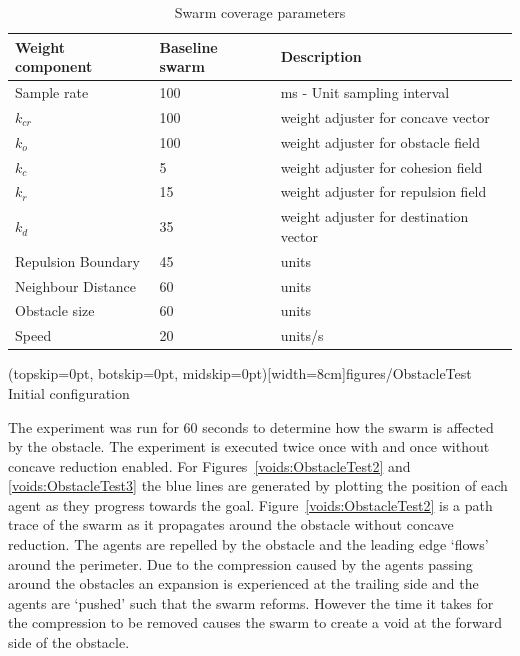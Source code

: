 \documentclass{ieeeaccess}
\begin{document}
\begin{table}
\caption{Swarm coverage parameters}
\label{tab:SwarmCoverageParameters}
\begin{center}
\begin{tabular}{| p{1.3cm} | p{1.3cm} | p{3.5cm} |}
\hline
\bf Weight \bf component & \bf Baseline \bf swarm & \bf Description \\ \hline
Sample rate & 100 & ms - Unit sampling interval\\  \hline
$k_{cr}$ & 100 & weight adjuster for concave vector\\  \hline
$k_o$ & 100 & weight adjuster for obstacle field\\  \hline
$k_c$ & 5 & weight adjuster for cohesion field\\  \hline
$k_r$ & 15 & weight adjuster for repulsion  field\\  \hline
$k_d$ & 35 & weight adjuster for destination vector\\  \hline
Repulsion Boundary & 45 & units\\  \hline
Neighbour Distance & 60 & units\\  \hline
Obstacle size & 60 & units\\  \hline
Speed & 20 & units/s\\  \hline
\end{tabular}
\end{center}
\end{table}

\Figure[t!](topskip=0pt, botskip=0pt, midskip=0pt)[width=8cm]{figures/ObstacleTest}
{Initial configuration\label{voids:ObstacleTest1}}


The experiment was run for 60 seconds to determine how the swarm is affected by the obstacle. The experiment is executed twice once with and once without concave reduction enabled. For Figures~\ref{voids:ObstacleTest2} and \ref{voids:ObstacleTest3} the blue lines are generated by plotting the position of each agent as they progress towards the goal. Figure~\ref{voids:ObstacleTest2} is a path trace of the swarm as it propagates around the obstacle without concave reduction. The agents are repelled by the obstacle and the leading edge `flows' around the perimeter. Due to the compression caused by the agents passing around the obstacles an expansion is experienced at the trailing side and the agents are `pushed' such that the swarm reforms. However the time it takes for the compression to be removed causes the swarm to create a void at the forward side of the obstacle.  
\end{document}
